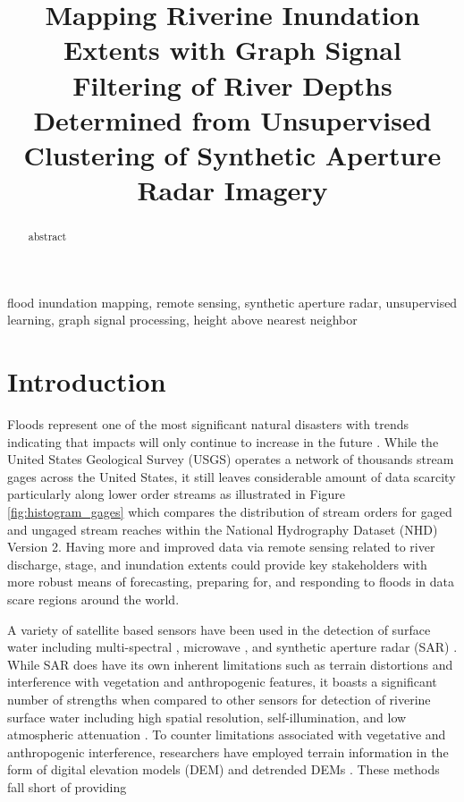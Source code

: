 \documentclass{article}
\title{Mapping Riverine Inundation Extents with Graph Signal Filtering of River Depths Determined from Unsupervised Clustering of Synthetic Aperture Radar Imagery}
\begin{document}
%
\maketitle
%
\begin{abstract}
abstract
\end{abstract}
%
\begin{keywords}
flood inundation mapping, remote sensing, synthetic aperture radar, unsupervised learning, graph signal processing, height above nearest neighbor 
\end{keywords}
%
\section{Introduction}
\label{sec:intro}

Floods represent one of the most significant natural disasters \cite{national_weather_service_2020,national_weather_service_2019,national_weather_service_2018,us_department_of_commerce_2020} with trends indicating that impacts will only continue to increase in the future \cite{mallakpour2015changing,downton2005reanalysis,kunkel1999temporal,pielke2000precipitation,corringham2019effect,tabari2020climate,milly2002increasing,wing2018estimates}. 
While the United States Geological Survey (USGS) operates a network of thousands stream gages across the United States, it still leaves considerable amount of data scarcity particularly along lower order streams as illustrated in Figure \ref{fig:histogram_gages} which compares the distribution of stream orders for gaged and ungaged stream reaches within the National Hydrography Dataset (NHD) Version 2.
Having more and improved data via remote sensing related to river discharge, stage, and inundation extents could provide key stakeholders with more robust means of forecasting, preparing for, and responding to floods in data scare regions around the world.

A variety of satellite based sensors have been used in the detection of surface water including multi-spectral \cite{nigro2014nasa,sanyal2004application,wang2004using,brakenridge2006modis,jain2005delineation,nghiem2000flood,hussain2011mapping,frazier2000water,dewan2006flood,brivio2002integration}, microwave \cite{de2015global,schumann2015microwave,de2010flood,bindlish2008role,de2009global,kundu2015flood}, and synthetic aperture radar (SAR) \cite{aristizabal2020high,shastry2019using,martinis2010automatic,kudahetty2012flood,schlaffer2015flood,chini2019sentinel,chaabani2018flood,huang2018automated,saatchi2019sar,kasischke2003effects,hess2003dual}.
While SAR does have its own inherent limitations such as terrain distortions and interference with vegetation and anthropogenic features, it boasts a significant number of strengths when compared to other sensors for detection of riverine surface water including high spatial resolution, self-illumination, and low atmospheric attenuation \cite{saatchi2019sar,muckenhuber2016open}.
To counter limitations associated with vegetative and anthropogenic interference, researchers have employed terrain information in the form of digital elevation models (DEM) and detrended DEMs \cite{townsend1998modeling,aristizabal2020high,shastry2019using,saatchi2019sar,twele2016sentinel,huang2017comparison}.
These methods fall short of providing
\end{document}
